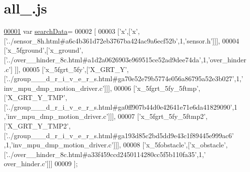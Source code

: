 \hypertarget{all__18_8js_source}{}\section{all\+\_.\+js}
\label{all__18_8js_source}

\begin{DoxyCode}
\hypertarget{all__18_8js_source.tex_l00001}{}\hyperlink{all__18_8js_ad01a7523f103d6242ef9b0451861231e}{00001} var \hyperlink{all__18_8js_ad01a7523f103d6242ef9b0451861231e}{searchData}=
00002 [
00003   [\textcolor{charliteral}{'x'},[\textcolor{charliteral}{'x'},[\textcolor{stringliteral}{'../sensor\_8h.html#a6c4b361d72eb3767ba424ac9a6ecf52b'},1,\textcolor{stringliteral}{'sensor.h'}]]],
00004   [\textcolor{stringliteral}{'x\_5fground'},[\textcolor{stringliteral}{'x\_ground'},[\textcolor{stringliteral}{'../over\_\_hinder\_8c.html#a1d2a0626903e969515ce52ad9dee74da'},1,\textcolor{stringliteral}{'over\_hinder.c'}]
      ]],
00005   [\textcolor{stringliteral}{'x\_5fgrt\_5fy'},[\textcolor{stringliteral}{'X\_GRT\_Y'},[\textcolor{stringliteral}{'../group\_\_\_d\_r\_i\_v\_e\_r\_s.html#ga70e52e79b5774e056a86795a52e3b027'},1,\textcolor{stringliteral}{'
      inv\_mpu\_dmp\_motion\_driver.c'}]]],
00006   [\textcolor{stringliteral}{'x\_5fgrt\_5fy\_5ftmp'},[\textcolor{stringliteral}{'X\_GRT\_Y\_TMP'},[\textcolor{stringliteral}{'../group\_\_\_d\_r\_i\_v\_e\_r\_s.html#ga0ff907b44d0e42641e71e6da41829090'},1
      ,\textcolor{stringliteral}{'inv\_mpu\_dmp\_motion\_driver.c'}]]],
00007   [\textcolor{stringliteral}{'x\_5fgrt\_5fy\_5ftmp2'},[\textcolor{stringliteral}{'X\_GRT\_Y\_TMP2'},[\textcolor{stringliteral}{'../group\_\_\_d\_r\_i\_v\_e\_r\_s.html#ga193d85c2bd5dd9e43c1f89445e999ac6'}
      ,1,\textcolor{stringliteral}{'inv\_mpu\_dmp\_motion\_driver.c'}]]],
00008   [\textcolor{stringliteral}{'x\_5fobstacle'},[\textcolor{stringliteral}{'x\_obstacle'},[\textcolor{stringliteral}{'../over\_\_hinder\_8c.html#a33f459ccd2450114280cc5f5b110fa35'},1,\textcolor{stringliteral}{'
      over\_hinder.c'}]]]
00009 ];
\end{DoxyCode}
